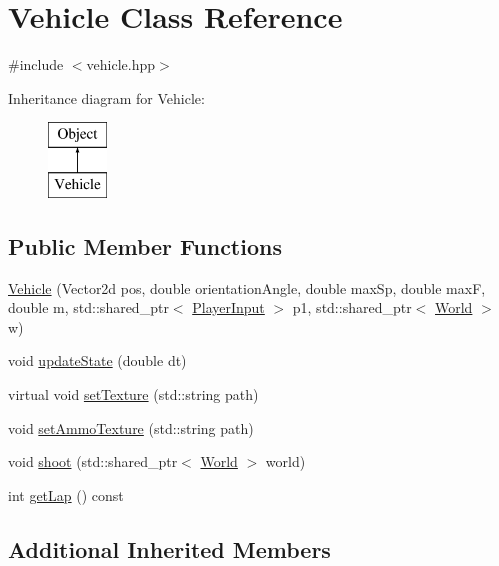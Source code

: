 \hypertarget{classVehicle}{}\section{Vehicle Class Reference}
\label{classVehicle}


{\ttfamily \#include $<$vehicle.\+hpp$>$}

Inheritance diagram for Vehicle\+:\begin{figure}[H]
\begin{center}
\leavevmode
\includegraphics[height=2.000000cm]{classVehicle}
\end{center}
\end{figure}
\subsection*{Public Member Functions}
\begin{DoxyCompactItemize}
\item 
\hyperlink{classVehicle_a60b696997b412b5dd48728bbc3f56dce}{Vehicle} (Vector2d pos, double orientation\+Angle, double max\+Sp, double maxF, double m, std\+::shared\+\_\+ptr$<$ \hyperlink{classPlayerInput}{Player\+Input} $>$ p1, std\+::shared\+\_\+ptr$<$ \hyperlink{classWorld}{World} $>$ w)
\item 
void \hyperlink{classVehicle_af1ea3f326eb5ca27e1a06f4fe81832ce}{update\+State} (double dt)
\item 
virtual void \hyperlink{classVehicle_ab1fbef5c7898343380c1d9aaab11c64a}{set\+Texture} (std\+::string path)
\item 
void \hyperlink{classVehicle_adfc1996e318be79103e6d34eb60da656}{set\+Ammo\+Texture} (std\+::string path)
\item 
void \hyperlink{classVehicle_a54a02d80bb7693b7e9e2b00bd1ef3217}{shoot} (std\+::shared\+\_\+ptr$<$ \hyperlink{classWorld}{World} $>$ world)
\item 
int \hyperlink{classVehicle_aa3ec0152e6944dcd9e3b219dbf4fbba5}{get\+Lap} () const
\end{DoxyCompactItemize}
\subsection*{Additional Inherited Members}


